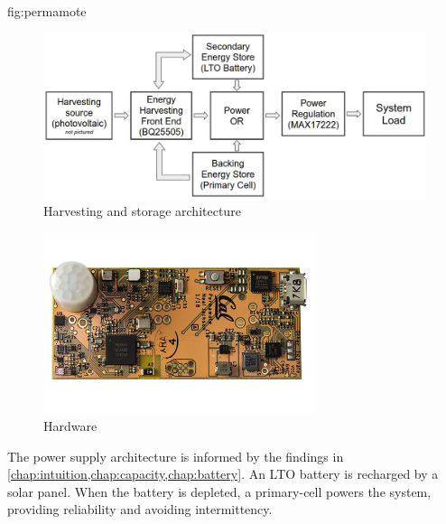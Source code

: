 \begin{definefigure}{fig:permamote}
    \centering
    \begin{subfigure}{0.7\columnwidth}
        \centering
        \includegraphics[width=\textwidth]{figs/capacity/arch}
        \caption{Harvesting and storage architecture}
    \end{subfigure}
    \begin{subfigure}{0.29\columnwidth}
        \centering
        \includegraphics[width=\textwidth,angle=90]{figs/capacity/permamote}
        \caption{Hardware}
    \end{subfigure}
    \caption{\normalfont The \name power supply architecture is informed by the
    findings in \cref{chap:intuition,chap:capacity,chap:battery}. An
    LTO battery is recharged by a solar panel. When the battery is depleted,
    a primary-cell powers the system, providing reliability and avoiding
    intermittency.
    }
\end{definefigure}

